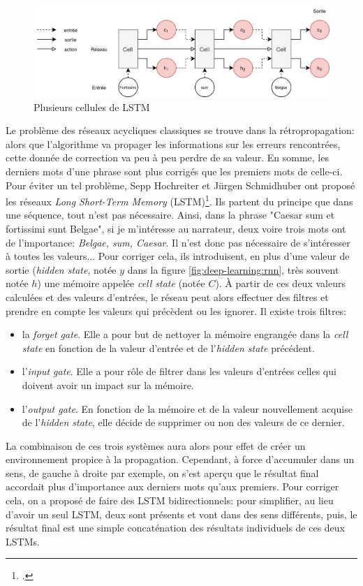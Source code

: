 \begin{figure}[h]
    \centering
    \includegraphics[width=\linewidth]{figures/chap2/LSTM-Zoom-Out.png}
    \caption{Plusieurs cellules de LSTM}
    \label{fig:deep-learning:lstm}
\end{figure}

Le problème des réseaux acycliques classiques se trouve dans la rétropropagation: alors que l'algorithme va propager les informations sur les erreurs rencontrées, cette donnée de correction va peu à peu perdre de sa valeur. En somme, les derniers mots d'une phrase sont plus corrigés que les premiers mots de celle-ci. Pour éviter un tel problème, Sepp Hochreiter et Jürgen Schmidhuber ont proposé les réseaux \textit{Long Short-Term Memory} (LSTM)\footcite{hochreiter_long_1997}. Ils partent du principe que dans une séquence, tout n'est pas nécessaire. Ainsi, dans la phrase "Caesar sum et fortissimi sunt Belgae", si je m'intéresse au narrateur, deux voire trois mots ont de l'importance: \textit{Belgae, sum, Caesar}. Il n'est donc pas nécessaire de s'intéresser à toutes les valeurs... Pour corriger cela, ils introduisent, en plus d'une valeur de sortie (\textit{hidden state}, notée $y$ dans la figure \ref{fig:deep-learning:rnn}, très souvent notée $h$) une mémoire appelée \textit{cell state} (notée $C$). À partir de ces deux valeurs calculées et des valeurs d'entrées, le réseau peut alors effectuer des filtres et prendre en compte les valeurs qui précèdent ou les ignorer. Il existe trois filtres:
\begin{itemize}
    \item la \textit{forget gate}. Elle a pour but de nettoyer la mémoire engrangée dans la \textit{cell state} en fonction de la valeur d'entrée et de l'\textit{hidden state} précédent. 
    \item l'\textit{input gate}. Elle a pour rôle de filtrer dans les valeurs d'entrées celles qui doivent avoir un impact sur la mémoire.
    \item l'\textit{output gate}. En fonction de la mémoire et de la valeur nouvellement acquise de l'\textit{hidden state}, elle décide de supprimer ou non des valeurs de ce dernier.
\end{itemize}
La combinaison de ces trois systèmes aura alors pour effet de créer un environnement propice à la propagation. Cependant, à force d'accumuler dans un sens, de gauche à droite par exemple, on s'est aperçu que le résultat final accordait plus d'importance aux derniers mots qu'aux premiers. Pour corriger cela, on a proposé de faire des LSTM bidirectionnels: pour simplifier, au lieu d'avoir un seul LSTM, deux sont présents et vont dans des sens différents, puis, le résultat final est une simple concaténation des résultats individuels de ces deux LSTMs.

